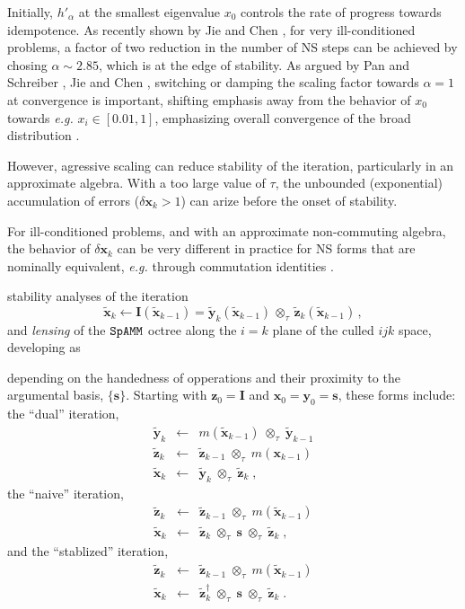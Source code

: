 \documentclass[letterpaper,twocolumn,amsmath,amsfont,amssymb,english,aps,jcp,preprintnumbers,groupaddress,nofootinbib,tightenlines]{revtex4}
\newcommand{\mat}[1]{\boldsymbol{#1}}
\newcommand{\mmat}[1]{\widetilde{\boldsymbol{#1}}}
\newcommand{\ot}{ {\scriptstyle \otimes}_{ \tau } }
\begin{document}
Initially, $h'_\alpha$ at the smallest eigenvalue $x_0$ controls the rate of progress towards idempotence.  
As recently shown by Jie and Chen \cite{Chen2014}, for very ill-conditioned problems, a factor of two reduction in the number of NS steps can be achieved 
by chosing $\alpha \sim 2.85$, which is at the edge of stability.   As argued by Pan and Schreiber \cite{Pan1991},
Jie and Chen \cite{Chen2014}, switching or damping the scaling factor towards $\alpha=1$ at convergence is important, shifting emphasis away from the 
behavior of $x_0$ towards {\em e.g.} $x_i \in [0.01,1]$, emphasizing overall convergence of the broad distribution \cite{Pan and Scriber}. 

However, agressive scaling can reduce stability of the iteration, particularly in an approximate algebra. 
With a too large value of $\tau$, the unbounded (exponential) accumulation of errors ($\delta \mat{x}_k > 1 $) can arize
before the onset of stability.  

For ill-conditioned problems, and with an approximate non-commuting algebra, the 
behavior of $\delta \mat{x}_k $ can be very different in practice for NS forms that are nominally equivalent, 
{\em e.g.} through commutation identities \cite{higham2006}.     


stability analyses of the iteration 
\begin{equation}
\widetilde{\mat{x}}_k \leftarrow \mat{I} \left( \widetilde{\mat{x}}_{k-1} \right) = \widetilde{\mat{y}}_k \left( \widetilde{\mat{x}}_{k-1} \right)
\, \ot \, \widetilde{\mat{z}}_k \left( \widetilde{\mat{x}}_{k-1} \right) \, ,
\end{equation}
and {\em lensing} of the $\tt SpAMM$ octree along the $i=k$ plane of the culled $ijk$ space,  developing as 


depending on the handedness of opperations and their proximity to the argumental basis, $\{ \mat{s} \}$.  
Starting with $\mat{z}_0=\mat{I}$ and $\mat{x}_0=\mat{y}_0=\mat{s}$, these forms include: the ``dual'' iteration,
\begin{eqnarray} \label{dualsiteration}
\mmat{y}_{k}  &\leftarrow& m \left( \mmat{x}_{k-1} \right) \; \ot \;  \mmat{y}_{k-1}  \\
\mmat{z}_{k}  &\leftarrow& \mmat{z}_{k-1}  \; \ot \;  m \left( \mat{x}_{k-1} \right) \\
\mmat{x}_{k} &\leftarrow& \mmat{y}_{k} \; \ot \; \mmat{z}_{k} \; ,
\end{eqnarray}
the ``naive'' iteration,
\begin{eqnarray}
\mmat{z}_{k}  &\leftarrow& \mmat{z}_{k-1} \; \ot \; m \left( \mmat{x}_{k-1} \right) \\
\mmat{x}_{k} &\leftarrow& \mmat{z}_{k} \; \ot \; \mat{s} \; \ot \; \mmat{z}_{k} \; ,
\end{eqnarray}
and the ``stablized'' iteration,
\begin{eqnarray}
\mmat{z}_{k}  &\leftarrow& \mmat{z}_{k-1}  \; \ot \; m \left( \mmat{x}_{k-1} \right) \\
\mmat{x}_{k} &\leftarrow& \mmat{z}^\dagger_{k} \; \ot \; \mat{s} \; \ot \; \mmat{z}_{k} \; .
\end{eqnarray}
\end{document}
